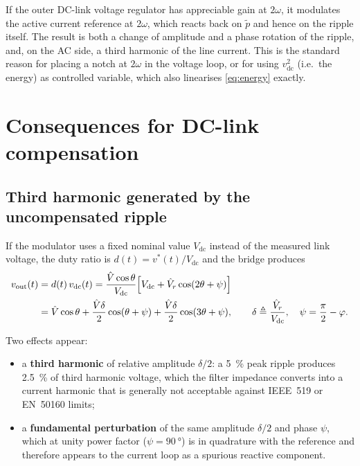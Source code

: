 \documentclass[11pt,a4paper]{article}
\begin{document}
If the outer DC-link voltage regulator has appreciable gain at $2\omega$, it
modulates the active current reference at $2\omega$, which reacts back on
$\tilde p$ and hence on the ripple itself. The result is both a change of
amplitude and a phase rotation of the ripple, and, on the AC side, a third
harmonic of the line current. This is the standard reason for placing a notch at
$2\omega$ in the voltage loop, or for using $v_{\mathrm{dc}}^2$ (i.e.\ the
energy) as controlled variable, which also linearises \eqref{eq:energy} exactly.

\section{Consequences for DC-link compensation}

\subsection{Third harmonic generated by the uncompensated ripple}

If the modulator uses a fixed nominal value $V_{\mathrm{dc}}$ instead of the
measured link voltage, the duty ratio is $d(t)=v^{*}(t)/V_{\mathrm{dc}}$ and the
bridge produces
\begin{align}
  v_{\mathrm{out}}(t) &= d(t)\,v_{\mathrm{dc}}(t)
   = \frac{\hat V \cos\theta}{V_{\mathrm{dc}}}
     \Bigl[V_{\mathrm{dc}} + \hat V_r\cos(2\theta+\psi)\Bigr] \notag \\
   &= \hat V\cos\theta
    + \frac{\hat V \delta}{2}\cos(\theta+\psi)
    + \frac{\hat V \delta}{2}\cos(3\theta+\psi),
    \qquad
    \delta \triangleq \frac{\hat V_r}{V_{\mathrm{dc}}},
    \quad \psi = \frac{\pi}{2}-\varphi .
  \label{eq:third}
\end{align}

Two effects appear:
\begin{itemize}
  \item a \textbf{third harmonic} of relative amplitude $\delta/2$: a
        \SI{5}{\percent} peak ripple produces \SI{2.5}{\percent} of third
        harmonic voltage, which the filter impedance converts into a current
        harmonic that is generally not acceptable against IEEE~519 or EN~50160
        limits;
  \item a \textbf{fundamental perturbation} of the same amplitude $\delta/2$ and
        phase $\psi$, which at unity power factor ($\psi = \SI{90}{\degree}$) is
        in quadrature with the reference and therefore appears to the current
        loop as a spurious reactive component.
\end{itemize}
\end{document}
